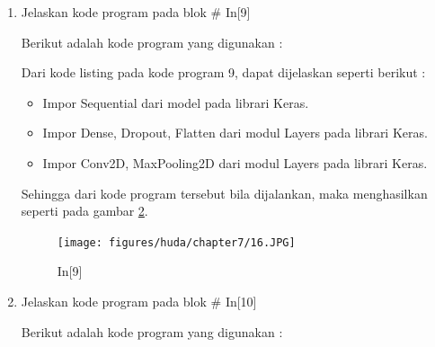 \begin{enumerate}
\begin{itemize}
\item Variabel test\_output\_int  akan mengubah data dari test\_output menjadi LabeEncoder
\item Dimana pada train\_output setelah diubah labelnya menjadi integer dilakukan one hot encoding diambil dari test\_output\_int dan menggunakan .reshape untuk memberikan bentuk baru ke array tanpa mengubah datanya dengan keterangan jika index dari integer tersebut ditandai dengan 1 dan sisanya yang bukan nol.
\item Variabel num\_classes akan menampilakn jumlah data dari classes yang telah dilakukan label encoder
\item Menampilkan tulisan "Number of classes : \%d dmana mengembalikan nilai integer dari num\_classes.
\end{itemize}
\par Sehingga dari kode program tersebut bila dijalankan, maka menghasilkan seperti pada gambar \ref{c7_15}.
\begin{figure}[!htbp]
	\centerline{\texttt{[image: figures/huda/chapter7/15.JPG]}}
	\caption{In[8]}
	\label{c7_15}
\end{figure}
\item Jelaskan kode program pada blok \# In[9]
\par Berikut adalah kode program yang digunakan :

\par Dari kode listing pada kode program 9, dapat dijelaskan seperti berikut :
\begin{itemize}
\item Impor Sequential dari model pada librari Keras.
\item Impor Dense, Dropout, Flatten dari modul Layers pada librari Keras.
\item Impor Conv2D, MaxPooling2D dari modul Layers pada librari Keras.
\end{itemize}
\par Sehingga dari kode program tersebut bila dijalankan, maka menghasilkan seperti pada gambar \ref{c7_16}.
\begin{figure}[!htbp]
	\centerline{\texttt{[image: figures/huda/chapter7/16.JPG]}}
	\caption{In[9]}
	\label{c7_16}
\end{figure}
\item Jelaskan kode program pada blok \# In[10]
\par Berikut adalah kode program yang digunakan :


\end{enumerate}

